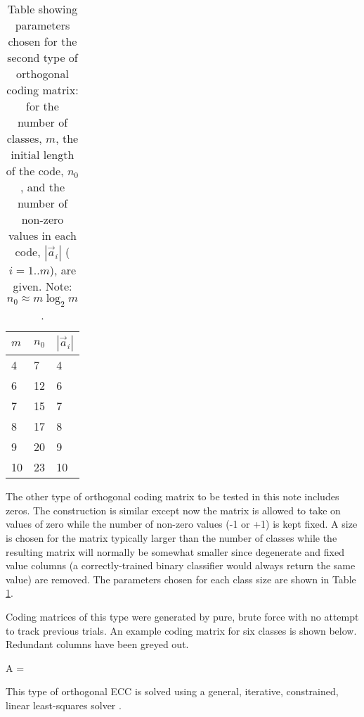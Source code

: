 {\revision
\begin{table}
	\caption{Table showing parameters chosen for the second type of
	orthogonal coding matrix: for the number of classes, $m$,
	the initial length of the code, $n_0$, and the number of non-zero
	values in each code, $|\vec a_i|$ ($i=1..m$), are given. 
	Note: $n_0 \approx m \log_2 m$.}\label{ortho_param}
	\begin{tabular}{l|ll}
		$m$ & $n_0$ & $|\vec a_i|$ \\
		\hline
		4 & 7 & 4 \\
		6 & 12 & 6 \\
		7 & 15 & 7 \\
		8 & 17 & 8 \\
		9 & 20 & 9 \\
		10 & 23 & 10 \\
	\end{tabular}
\end{table}
}

{\revision
The other type of orthogonal coding matrix to be tested in this note
includes zeros.
The construction is similar except now the matrix is allowed to take on values
of zero while the number of non-zero values (-1 or +1) is kept fixed.
A size is chosen for the matrix typically larger than the number of
classes while the resulting matrix will normally be somewhat smaller since
degenerate and fixed value columns (a correctly-trained binary classifier would always return the same value) are removed.
The parameters chosen for each class size are shown in Table
\ref{ortho_param}.}

{\revision
Coding matrices of this type were generated by pure, brute force with no
attempt to track previous trials.
An example coding matrix for six classes is shown below.
Redundant columns have been greyed out.
\begin{eqnnon}
	A = 
\end{eqnnon}
This type of orthogonal ECC is solved using a general, iterative,
constrained, linear least-squares solver \citep{Lawson_Hanson1995}.}


